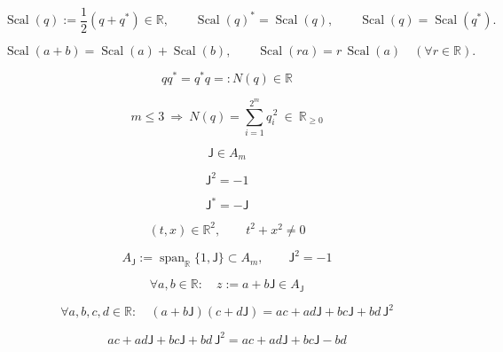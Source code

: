 \documentclass[12pt]{article}
\begin{document}
\begin{equation}
\operatorname{Scal}(q):=\frac12(q+q^{*})\in\mathbb{R},\qquad
\operatorname{Scal}(q)^{*}=\operatorname{Scal}(q),\qquad
\operatorname{Scal}(q)=\operatorname{Scal}(q^{*}).
\end{equation}

\begin{equation}
\operatorname{Scal}(a+b)=\operatorname{Scal}(a)+\operatorname{Scal}(b),\qquad
\operatorname{Scal}(ra)=r\,\operatorname{Scal}(a)\quad(\forall r\in\mathbb{R}).
\end{equation}

\begin{equation}
qq^{*}=q^{*}q=:N(q)\in\mathbb{R}
\end{equation}

\begin{equation}
m\le 3\ \Longrightarrow\ N(q)=\sum_{i=1}^{2^m} q_i^{\,2}\ \in\ \mathbb{R}_{\ge0}
\end{equation}

\begin{equation}
\mathsf{J}\in A_m
\end{equation}

\begin{equation}
\mathsf{J}^2=-1
\end{equation}

\begin{equation}
\mathsf{J}^{*}=-\mathsf{J}
\end{equation}

\begin{equation}
(t,x)\in\mathbb{R}^2,\qquad t^2+x^2\ne 0
\end{equation}

\begin{equation}
A_{\mathsf{J}}:=\operatorname{span}_{\mathbb{R}}\{1,\mathsf{J}\}\subset A_m,\qquad
\mathsf{J}^{2}=-1
\end{equation}

\begin{equation}
\forall a,b\in\mathbb{R}:\quad z:=a+b\mathsf{J}\in A_{\mathsf{J}}
\end{equation}

\begin{equation}
\forall a,b,c,d\in\mathbb{R}:\quad
(a+b\mathsf{J})(c+d\mathsf{J})
=ac+ad\mathsf{J}+bc\mathsf{J}+bd\,\mathsf{J}^2
\end{equation}

\begin{equation}
ac+ad\mathsf{J}+bc\mathsf{J}+bd\,\mathsf{J}^2
=ac+ad\mathsf{J}+bc\mathsf{J}-bd
\end{equation}
\end{document}

